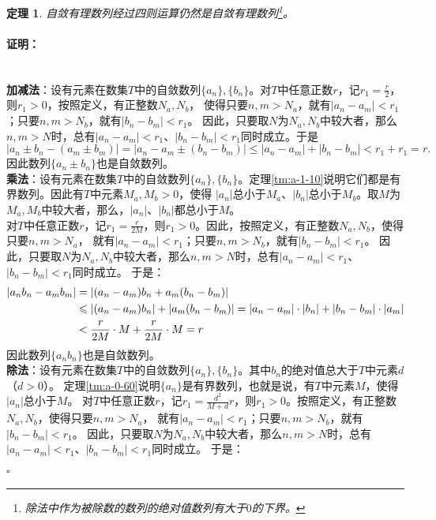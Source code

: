 \documentclass[12pt,UTF8]{ctexbook}
\newtheorem{tm}{定理}[section]
\renewenvironment{proof}{\paragraph{\textbf{证明：}}}{\hfill$\square$}
\begin{document}
\begin{appendix}
\begin{tm}\label{tm:a-1-3}
    自敛有理数列经过四则运算仍然是自敛有理数列\footnote{除法中作为被除数的数列的绝对值数列有大于$0$的下界。}。
\end{tm}
\begin{proof}
    \mbox{} \\
    \textbf{加减法}：设有元素在数集$T$中的自敛数列$\{a_n\}, \{b_n\}$。对$T$中任意正数$r$，记$r_1=\frac{r}{2}$，则$r_1>0$，按照定义，有正整数$N_a, N_b$，
    使得只要$n,m>N_a$，就有$|a_n - a_m| < r_1$；只要$n,m>N_b$，就有$|b_n - b_m| < r_1$。
    因此，只要取$N$为$N_a, N_b$中较大者，那么$n,m>N$时，总有$|a_n - a_m| < r_1$、$|b_n - b_m| < r_1$同时成立。于是
    $$ |a_n \pm b_n - (a_m \pm b_m)| = |a_n - a_m \pm (b_n - b_m)| \leqslant |a_n - a_m| + |b_n - b_m| < r_1 + r_1 = r. $$
    因此数列$\{a_n \pm b_n\}$也是自敛数列。\\
    \textbf{乘法}：设有元素在数集$T$中的自敛数列$\{a_n\}, \{b_n\}$。定理\ref{tm:a-1-10}说明它们都是有界数列。因此有$T$中元素$M_a, M_b>0$，使得
    $|a_n|$总小于$M_a$、$|b_n|$总小于$M_b$。取$M$为$M_a, M_b$中较大者，那么，$|a_n|$、$|b_n|$都总小于$M$。\\    
    对$T$中任意正数$r$，记$r_1 = \frac{r}{2M}$，则$r_1>0$。因此，按照定义，有正整数$N_a, N_b$，使得只要$n,m>N_a$，
    就有$|a_n - a_m| < r_1$；只要$n,m>N_b$，就有$|b_n - b_m| < r_1$。
    因此，只要取$N$为$N_a, N_b$中较大者，那么$n,m>N$时，总有$|a_n - a_m| < r_1$、$|b_n - b_m| < r_1$同时成立。
    于是：
    \begin{align}
        |a_nb_n - a_mb_m| &= |(a_n - a_m)b_n + a_m(b_n - b_m)| \notag \\
        &\leqslant |(a_n - a_m)b_n| + |a_m(b_n - b_m)| = |a_n - a_m|\cdot |b_n| + |b_n - b_m|\cdot|a_m| \notag \\
        &< \frac{r}{2M} \cdot M + \frac{r}{2M} \cdot M = r \notag
    \end{align}
    因此数列$\{a_n b_n\}$也是自敛数列。\\
    \textbf{除法}：设有元素在数集$T$中的自敛数列$\{a_n\}, \{b_n\}$。其中$b_n$的绝对值总大于$T$中元素$d$（$d > 0$）。
    定理\ref{tm:a-0-60}说明$\{a_n\}$是有界数列，也就是说，有$T$中元素$M$，使得$|a_n|$总小于$M$。
    对$T$中任意正数$r$，记$r_1 = \frac{d^2}{M+d}r$，则$r_1>0$。按照定义，有正整数$N_a, N_b$，使得只要$n,m>N_a$，
    就有$|a_n - a_m| < r_1$；只要$n,m>N_b$，就有$|b_n - b_m| < r_1$。
    因此，只要取$N$为$N_a, N_b$中较大者，那么$n,m>N$时，总有$|a_n - a_m| < r_1$、$|b_n - b_m| < r_1$同时成立。
    于是：
    \begin{align}

\end{align}
\end{proof}
\end{appendix}
\end{document}
